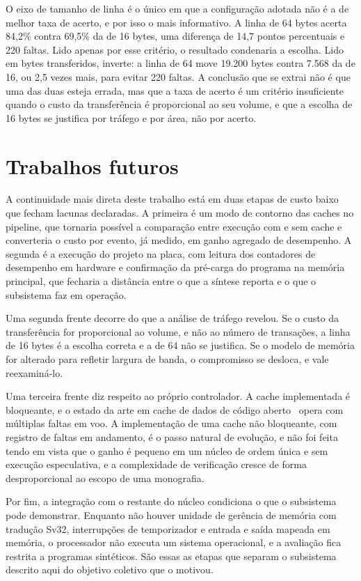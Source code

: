 O eixo de tamanho de linha é o único em que a configuração adotada não é a de melhor taxa de acerto, e por isso o mais informativo. A linha de 64 bytes acerta 84,2\% contra 69,5\% da de 16 bytes, uma diferença de 14,7 pontos percentuais e 220 faltas. Lido apenas por esse critério, o resultado condenaria a escolha. Lido em bytes transferidos, inverte: a linha de 64 move 19.200 bytes contra 7.568 da de 16, ou 2,5 vezes mais, para evitar 220 faltas. A conclusão que se extrai não é que uma das duas esteja errada, mas que a taxa de acerto é um critério insuficiente quando o custo da transferência é proporcional ao seu volume, e que a escolha de 16 bytes se justifica por tráfego e por área, não por acerto.

\section{Trabalhos futuros}\label{sec:5.3}

A continuidade mais direta deste trabalho está em duas etapas de custo baixo que fecham lacunas declaradas. A primeira é um modo de contorno das caches no pipeline, que tornaria possível a comparação entre execução com e sem cache e converteria o custo por evento, já medido, em ganho agregado de desempenho. A segunda é a execução do projeto na placa, com leitura dos contadores de desempenho em hardware e confirmação da pré-carga do programa na memória principal, que fecharia a distância entre o que a síntese reporta e o que o subsistema faz em operação.

Uma segunda frente decorre do que a análise de tráfego revelou. Se o custo da transferência for proporcional ao volume, e não ao número de transações, a linha de 16 bytes é a escolha correta e a de 64 não se justifica. Se o modelo de memória for alterado para refletir largura de banda, o compromisso se desloca, e vale reexaminá-lo.

Uma terceira frente diz respeito ao próprio controlador. A cache implementada é bloqueante, e o estado da arte em cache de dados de código aberto~\cite{million2024hpdcache} opera com múltiplas faltas em voo. A implementação de uma cache não bloqueante, com registro de faltas em andamento, é o passo natural de evolução, e não foi feita tendo em vista que o ganho é pequeno em um núcleo de ordem única e sem execução especulativa, e a complexidade de verificação cresce de forma desproporcional ao escopo de uma monografia.

Por fim, a integração com o restante do núcleo condiciona o que o subsistema pode demonstrar. Enquanto não houver unidade de gerência de memória com tradução Sv32, interrupções de temporizador e entrada e saída mapeada em memória, o processador não executa um sistema operacional, e a avaliação fica restrita a programas sintéticos. São essas as etapas que separam o subsistema descrito aqui do objetivo coletivo que o motivou.
